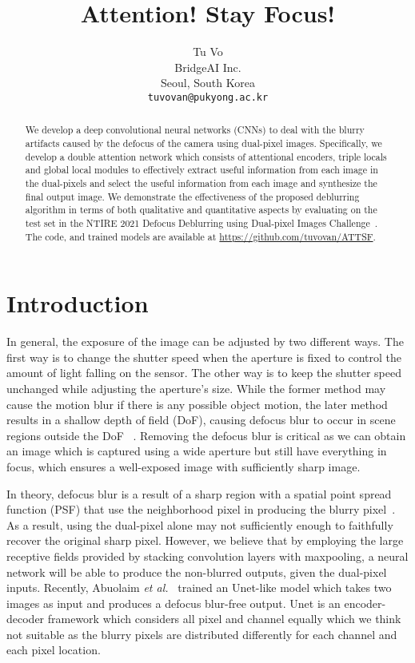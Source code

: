 \documentclass[final]{cvpr}
\begin{document}
\title{Attention! Stay Focus!}

\author{Tu Vo\\
BridgeAI Inc.\\
Seoul, South Korea\\
{\tt\small tuvovan@pukyong.ac.kr}
}

\maketitle


\begin{abstract}
   We develop a deep convolutional neural networks (CNNs) to deal with the blurry artifacts caused by the defocus of the camera using dual-pixel images. Specifically, we develop a double attention network which consists of attentional encoders, triple locals and global local modules to effectively extract useful information from each image in the dual-pixels and select the useful information from each image and synthesize the final output image. We demonstrate the effectiveness of the proposed deblurring algorithm in terms of both qualitative and quantitative aspects by evaluating on the test set in the NTIRE 2021 Defocus Deblurring using Dual-pixel Images Challenge~\cite{ntire}. The code, and trained models are available at  \url{https://github.com/tuvovan/ATTSF}.
\end{abstract}

\section{Introduction}
In general, the exposure of the image can be adjusted by two different ways. The first way is to change the shutter speed when the aperture is fixed to control the amount of light falling on the sensor. The other way is to keep the shutter speed unchanged while adjusting the aperture's size. While the former method may cause the motion blur if there is any possible object motion, the later method results in a shallow depth of field (DoF), causing defocus blur to occur in scene regions outside the DoF~\cite{abuolaim2020defocus} .
Removing the defocus blur is critical as we can obtain an image which is captured using a wide aperture but still have everything in focus, which ensures a well-exposed image with sufficiently sharp image.

In theory, defocus blur is a result of a sharp region with a spatial point spread function (PSF) that use the neighborhood pixel in producing the blurry pixel~\cite{tang}. As a result, using the dual-pixel alone may not sufficiently enough to faithfully recover the original sharp pixel. However, we believe that by employing the large receptive fields provided by stacking convolution layers with maxpooling, a neural network will be able to produce the non-blurred outputs, given the dual-pixel inputs.
Recently, Abuolaim \textit{et al.}~\cite{abuolaim2020defocus} trained an Unet-like model which takes two images as input and produces a defocus blur-free output. Unet is an encoder-decoder framework which considers all pixel and channel equally which we think not suitable as the blurry pixels are distributed differently for each channel and each pixel location.
\end{document}
